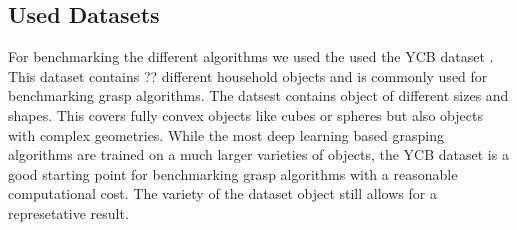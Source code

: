 \subsection{Used Datasets}
For benchmarking the different algorithms we used the used the YCB dataset \cite{}.
This dataset contains ?? different household objects and is commonly used for benchmarking grasp algorithms.
The datsest contains object of different sizes and shapes.
This covers fully convex objects like cubes or spheres but also objects with complex geometries.
While the most deep learning based grasping algorithms are trained on a much larger varieties of objects, the YCB dataset is a good starting point for
benchmarking grasp algorithms with a reasonable computational cost.
The variety of the dataset object still allows for a represetative result.
